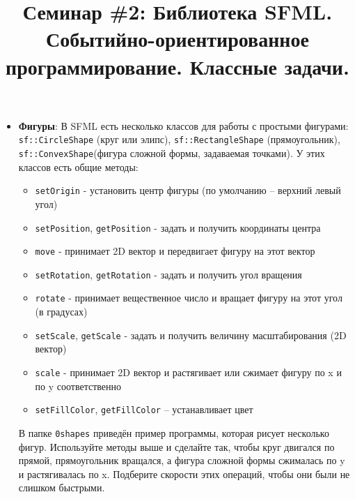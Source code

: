 \documentclass{article}
\begin{document}
\title{Семинар \#2: Библиотека SFML. Событийно-ориентированное программирование. Классные задачи.\vspace{-5ex}}\date{}\maketitle
\begin{itemize}
\item \textbf{Фигуры}: В SFML есть несколько классов для работы с простыми фигурами: \texttt{sf::CircleShape} (круг или элипс), \texttt{sf::RectangleShape} (прямоугольник), \texttt{sf::ConvexShape}(фигура сложной формы, задаваемая точками). У этих классов есть общие методы:
\begin{itemize}
\item \texttt{setOrigin} - установить центр фигуры (по умолчанию -- верхний левый угол)
\item \texttt{setPosition}, \texttt{getPosition} - задать и получить координаты центра
\item \texttt{move} - принимает 2D вектор и передвигает фигуру на этот вектор
\item \texttt{setRotation}, \texttt{getRotation} - задать и получить угол вращения
\item \texttt{rotate} - принимает вещественное число и вращает фигуру на этот угол (в градусах)
\item \texttt{setScale}, \texttt{getScale} - задать и получить величину масштабирования (2D вектор)
\item \texttt{scale} - принимает  2D вектор и растягивает или сжимает фигуру по x и по y соответственно
\item \texttt{setFillColor}, \texttt{getFillColor} -- устанавливает цвет
\end{itemize}
В папке \texttt{0shapes} приведён пример программы, которая рисует несколько фигур. Используйте методы выше и сделайте так, чтобы круг двигался по прямой, прямоугольник вращался, а фигура сложной формы сжималась по y и растягивалась по x. Подберите скорости этих операций, чтобы они были не слишком быстрыми.


\end{itemize}
\end{document}
